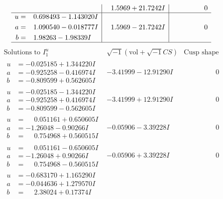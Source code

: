 \documentclass[1p]{elsarticle_modified}
\theoremstyle{definition}
\newcommand{\I}{\sqrt{-1}}
\begin{document}
$$\begin{array}{c|c|c}
 & \phantom{-}1.5969 + 21.7242 I & \phantom{-0.000000 } 0 \\ \hline\begin{aligned}
u &= \phantom{-}0.698493 - 1.143020 I \\
a &= \phantom{-}1.090540 - 0.018777 I \\
b &= \phantom{-}1.98263 - 1.98339 I\end{aligned}
 & \phantom{-}1.5969 - 21.7242 I & \phantom{-0.000000 } 0\\
 \hline 
 \end{array}$$\newpage$$\begin{array}{c|c|c}  
\text{Solutions to }I^u_{1}& \I (\text{vol} + \sqrt{-1}CS) & \text{Cusp shape}\\
 \hline 
\begin{aligned}
u &= -0.025185 + 1.344220 I \\
a &= -0.925258 - 0.416974 I \\
b &= -0.809599 + 0.562605 I\end{aligned}
 & -3.41999 - 12.91290 I & \phantom{-0.000000 } 0 \\ \hline\begin{aligned}
u &= -0.025185 - 1.344220 I \\
a &= -0.925258 + 0.416974 I \\
b &= -0.809599 - 0.562605 I\end{aligned}
 & -3.41999 + 12.91290 I & \phantom{-0.000000 } 0 \\ \hline\begin{aligned}
u &= \phantom{-}0.051161 + 0.650605 I \\
a &= -1.26048 - 0.90266 I \\
b &= \phantom{-}0.754968 + 0.560515 I\end{aligned}
 & -0.05906 - 3.39228 I & \phantom{-0.000000 } 0 \\ \hline\begin{aligned}
u &= \phantom{-}0.051161 - 0.650605 I \\
a &= -1.26048 + 0.90266 I \\
b &= \phantom{-}0.754968 - 0.560515 I\end{aligned}
 & -0.05906 + 3.39228 I & \phantom{-0.000000 } 0 \\ \hline\begin{aligned}
u &= -0.683170 + 1.165290 I \\
a &= -0.044636 + 1.279570 I \\
b &= \phantom{-}2.38024 + 0.17374 I\end{aligned}

\end{array}$$
\end{document}
